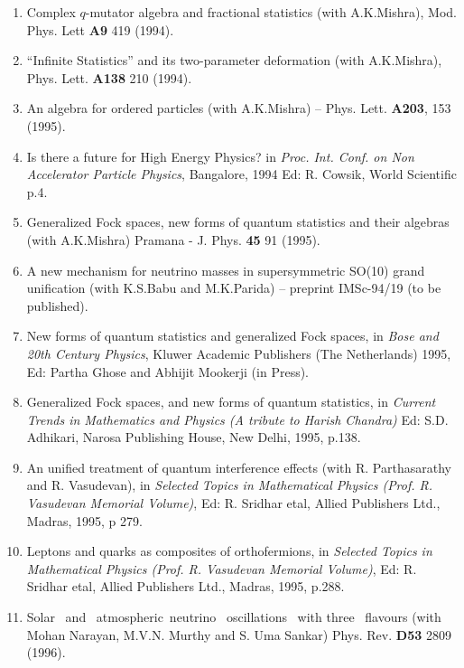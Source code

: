\begin{enumerate}
\item Complex $q$-mutator algebra and fractional statistics
(with A.K.Mishra), Mod. Phys. Lett {\bf A9} 419 (1994).

\item ``Infinite Statistics'' and its two-parameter deformation
(with A.K.Mishra), Phys. Lett. {\bf A138} 210 (1994).

\item An algebra for ordered particles (with A.K.Mishra) --
Phys. Lett. {\bf A203}, 153 (1995).

\item Is there a future for High Energy Physics? in {\it Proc. Int.
Conf. on Non Accelerator Particle Physics}, Bangalore, 1994 Ed: R.
Cowsik, World Scientific p.4.

\item Generalized Fock spaces, new forms of quantum statistics and
their algebras (with A.K.Mishra) Pramana - J. Phys. {\bf 45} 91 (1995).

\item A new mechanism for neutrino masses in supersymmetric SO(10)
grand unification (with K.S.Babu and M.K.Parida) -- preprint IMSc-94/19
(to be published).

\item New forms of quantum statistics and generalized Fock spaces,
in {\it Bose and 20th Century Physics}, Kluwer Academic Publishers (The
Netherlands) 1995, Ed: Partha Ghose and Abhijit Mookerji (in Press).

\item Generalized Fock spaces, and new forms of quantum statistics, in
{\it Current Trends  in Mathematics and Physics
(A tribute to Harish Chandra)} Ed: S.D. Adhikari,
Narosa Publishing House, New Delhi, 1995, p.138. 

\item An unified treatment of quantum interference effects (with R.
Parthasarathy and R. Vasudevan), in {\it Selected Topics in Mathematical
Physics (Prof. R. Vasudevan Memorial Volume)}, Ed: R. Sridhar etal,
Allied Publishers Ltd., Madras, 1995, p 279.

\item Leptons and quarks as composites of orthofermions, in {\it
Selected Topics in Mathematical Physics (Prof. R. Vasudevan Memorial
Volume)}, Ed: R. Sridhar etal, Allied Publishers Ltd., Madras, 1995,
p.288.

\item Solar \ and \ atmospheric\ neutrino \ oscillations \ with
three \ flavours (with Mohan Narayan, M.V.N. Murthy and S. Uma Sankar)
Phys. Rev. {\bf D53} 2809 (1996).


\end{enumerate}
